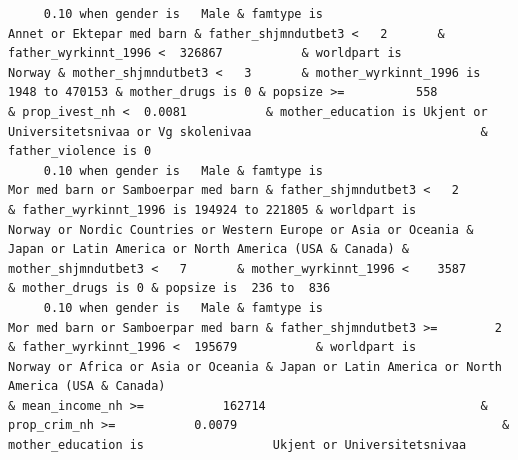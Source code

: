 \documentclass[
  letterpaper,
  DIV=11,
  numbers=noendperiod]{scrreprt}
\begin{document}
\begin{verbatim}
     0.10 when gender is   Male & famtype is                                        Annet or Ektepar med barn & father_shjmndutbet3 <   2       & father_wyrkinnt_1996 <  326867           & worldpart is                                                                                                                              Norway & mother_shjmndutbet3 <   3       & mother_wyrkinnt_1996 is   1948 to 470153 & mother_drugs is 0 & popsize >=          558                                                                                                                                    & prop_ivest_nh <  0.0081           & mother_education is Ukjent or Universitetsnivaa or Vg skolenivaa                                & father_violence is 0                                                                                                               
     0.10 when gender is   Male & famtype is                              Mor med barn or Samboerpar med barn & father_shjmndutbet3 <   2       & father_wyrkinnt_1996 is 194924 to 221805 & worldpart is            Norway or Nordic Countries or Western Europe or Asia or Oceania & Japan or Latin America or North America (USA & Canada) & mother_shjmndutbet3 <   7       & mother_wyrkinnt_1996 <    3587           & mother_drugs is 0 & popsize is  236 to  836                                                                                                                                                                                                                                                                                                                                                                                                               
     0.10 when gender is   Male & famtype is                              Mor med barn or Samboerpar med barn & father_shjmndutbet3 >=        2 & father_wyrkinnt_1996 <  195679           & worldpart is                                        Norway or Africa or Asia or Oceania & Japan or Latin America or North America (USA & Canada)                                                                                                                                                          & mean_income_nh >=           162714                              & prop_crim_nh >=           0.0079                                     & mother_education is                  Ukjent or Universitetsnivaa                                                                                                                                                                     

\end{verbatim}
\end{document}
